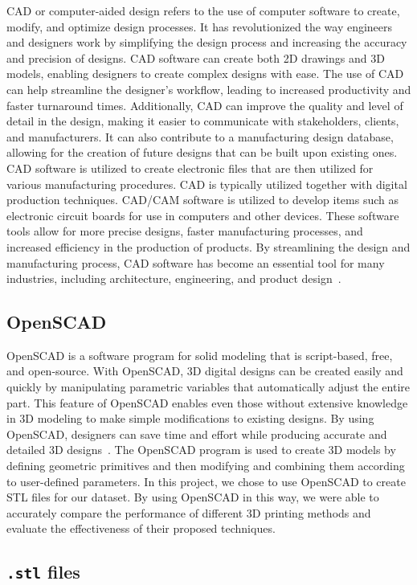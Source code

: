 \documentclass[sigconf,authorversion,nonacm]{acmart}
\begin{document}
CAD or computer-aided design refers to the use of computer software to create, modify, and optimize design processes.
It has revolutionized the way engineers and designers work by simplifying the design process and increasing the accuracy and precision of designs.
CAD software can create both 2D drawings and 3D models, enabling designers to create complex designs with ease. The use of CAD can help streamline the designer's workflow, leading to increased productivity and faster turnaround times.
Additionally, CAD can improve the quality and level of detail in the design, making it easier to communicate with stakeholders, clients, and manufacturers.
It can also contribute to a manufacturing design database, allowing for the creation of future designs that can be built upon existing ones.
CAD software is utilized to create electronic files that are then utilized for various manufacturing procedures.
CAD is typically utilized together with digital production techniques. CAD/CAM software is utilized to develop items such as electronic circuit boards for use in computers and other devices.
These software tools allow for more precise designs, faster manufacturing processes, and increased efficiency in the production of products.
By streamlining the design and manufacturing process, CAD software has become an essential tool for many industries, including architecture, engineering, and product design~\cite{chai_2020}.

\subsection{OpenSCAD}
OpenSCAD is a software program for solid modeling that is script-based, free, and open-source.
With OpenSCAD, 3D digital designs can be created easily and quickly by manipulating parametric variables that automatically adjust the entire part.
This feature of OpenSCAD enables even those without extensive knowledge in 3D modeling to make simple modifications to existing designs.
By using OpenSCAD, designers can save time and effort while producing accurate and detailed 3D designs~\cite{pearce2015applications}.
The OpenSCAD program is used to create 3D models by defining geometric primitives and then modifying and combining them according to user-defined parameters.
In this project, we chose to use OpenSCAD to create STL files for our dataset. By using OpenSCAD in this way, we were able to accurately compare the performance of different 3D printing methods and evaluate the effectiveness of their proposed techniques.
\subsection{\texttt{.stl} files}
\end{document}
